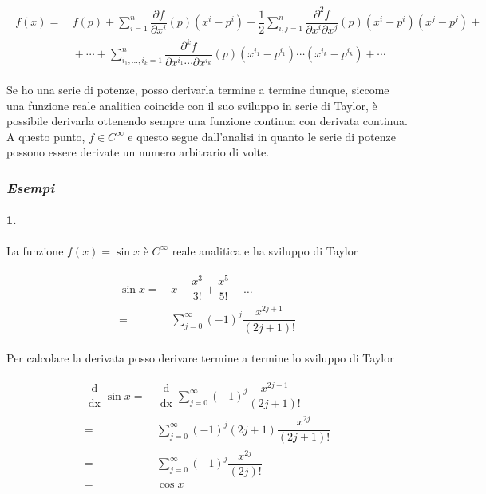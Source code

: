 \begin{align}
	\begin{split}
		f (x) =& \, f (p) + \sum_{i=1}^{n} \dfrac{\partial f}{\partial x^{i}} (p) (x^{i} - p^{i}) + \dfrac{1}{2} \sum_{i,j=1}^{n} \dfrac{\partial^{2} f}{\partial x^{i} \partial x^{j}} (p) (x^{i} - p^{i}) (x^{j} - p^{j}) +\\
		& \, + \cdots + \sum_{i_{1},\dots,i_{k}=1}^{n} \dfrac{\partial^{k} f}{\partial x^{i_{1}} \cdots \partial x^{i_{k}}} (p) (x^{i_{1}} - p^{i_{1}}) \cdots (x^{i_{k}} - p^{i_{k}}) + \cdots
	\end{split}
\end{align}

Se ho una serie di potenze, posso derivarla termine a termine dunque, siccome una funzione reale analitica coincide con il suo sviluppo in serie di Taylor, è possibile derivarla ottenendo sempre una funzione continua con derivata continua. A questo punto, $ f \in C^{\infty} $ e questo segue dall'analisi in quanto le serie di potenze possono essere derivate un numero arbitrario di volte.

\subsubsection{\textit{Esempi}}

\paragraph{1.}

La funzione $ f (x) = \sin x $ è $ C^{\infty} $ reale analitica e ha sviluppo di Taylor

\begin{align}
	\begin{split}
		\sin x =& \, x - \dfrac{x^{3}}{3!} + \dfrac{x^{5}}{5!} - \dots\\
		=& \, \sum_{j=0}^{\infty} (-1)^{j} \dfrac{x^{2j+1}}{(2j+1)!}
	\end{split}
\end{align}

Per calcolare la derivata posso derivare termine a termine lo sviluppo di Taylor

\begin{align}
	\begin{split}
		\dfrac{\operatorname{d}}{\operatorname{dx}} \sin x =& \, \dfrac{\operatorname{d}}{\operatorname{dx}} \sum_{j=0}^{\infty} (-1)^{j} \dfrac{x^{2j+1}}{(2j+1)!}\\
		=& \, \sum_{j=0}^{\infty} (-1)^{j} (2j+1) \dfrac{x^{2j}}{(2j+1)!}\\
		=& \, \sum_{j=0}^{\infty} (-1)^{j} \dfrac{x^{2j}}{(2j)!}\\
		=& \, \cos x
	\end{split}
\end{align}

